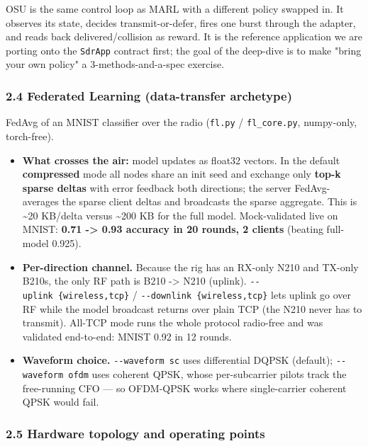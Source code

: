 \documentclass[
  10pt,
]{article}
\providecommand{\tightlist}{%
  \setlength{\itemsep}{0pt}\setlength{\parskip}{0pt}}
\begin{document}
OSU is the same control loop as MARL with a different policy swapped in.
It observes its state, decides transmit-or-defer, fires one burst
through the adapter, and reads back delivered/collision as reward. It is
the reference application we are porting onto the \texttt{SdrApp}
contract first; the goal of the deep-dive is to make "bring your own
policy" a 3-methods-and-a-spec exercise.

\hypertarget{24-federated-learning-data-transfer-archetype}{%
\subsubsection{2.4 Federated Learning (data-transfer
archetype)}\label{24-federated-learning-data-transfer-archetype}}

FedAvg of an MNIST classifier over the radio (\texttt{fl.py} /
\texttt{fl\_core.py}, numpy-only, torch-free).

\begin{itemize}
\tightlist
\item
  \textbf{What crosses the air:} model updates as float32 vectors. In
  the default \textbf{compressed} mode all nodes share an init seed and
  exchange only \textbf{top-k sparse deltas} with error feedback both
  directions; the server FedAvg-averages the sparse client deltas and
  broadcasts the sparse aggregate. This is \textasciitilde20 KB/delta
  versus \textasciitilde200 KB for the full model. Mock-validated live
  on MNIST: \textbf{0.71 -\textgreater{} 0.93 accuracy in 20 rounds, 2
  clients} (beating full-model 0.925).
\item
  \textbf{Per-direction channel.} Because the rig has an RX-only N210
  and TX-only B210s, the only RF path is B210 -\textgreater{} N210
  (uplink). \texttt{-\/-uplink\ \{wireless,tcp\}} /
  \texttt{-\/-downlink\ \{wireless,tcp\}} lets uplink go over RF while
  the model broadcast returns over plain TCP (the N210 never has to
  transmit). All-TCP mode runs the whole protocol radio-free and was
  validated end-to-end: MNIST 0.92 in 12 rounds.
\item
  \textbf{Waveform choice.} \texttt{-\/-waveform\ sc} uses differential
  DQPSK (default); \texttt{-\/-waveform\ ofdm} uses coherent QPSK, whose
  per-subcarrier pilots track the free-running CFO --- so OFDM-QPSK
  works where single-carrier coherent QPSK would fail.
\end{itemize}

\hypertarget{25-hardware-topology-and-operating-points}{%
\subsubsection{2.5 Hardware topology and operating
points}\label{25-hardware-topology-and-operating-points}}
\end{document}
